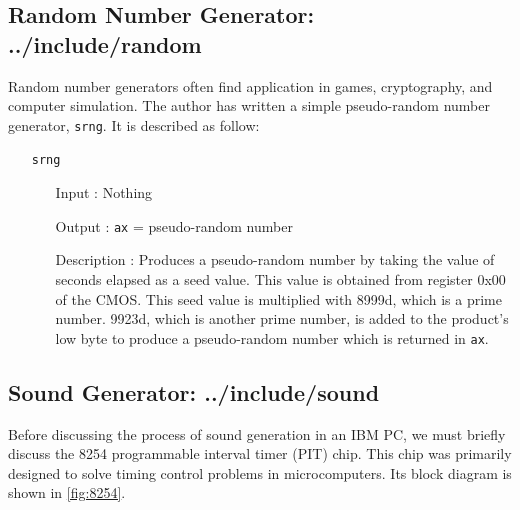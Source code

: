 \subsection{Random Number Generator: ../include/random}
Random number generators often find application in games, cryptography, and computer simulation. The author has written a simple pseudo-random number generator, \texttt{srng}. It is described as follow:
\begin{enumerate}
  \item[]\texttt{srng}
  		\begin{enumerate}[align=parleft, labelsep=2cm, leftmargin=1.06in]
  		  \item[Input]: Nothing 
  		  \item[Output]: \texttt{ax} = pseudo-random number
  		  \item[Description]: Produces a pseudo-random number by taking the value of seconds elapsed as a seed value. This value is obtained from register 0x00 of the CMOS. This seed value is multiplied with 8999d, which is a prime number. 9923d, which is another prime number, is added to the product's low byte to produce a pseudo-random number which is returned in \texttt{ax}. 
  		\end{enumerate}
\end{enumerate}

\subsection{Sound Generator: ../include/sound}
Before discussing the process of sound generation in an IBM PC, we must briefly discuss the 8254 programmable interval timer (PIT) chip. This chip was primarily designed to solve timing control problems in microcomputers. Its block diagram is shown in \autoref{fig:8254}.

